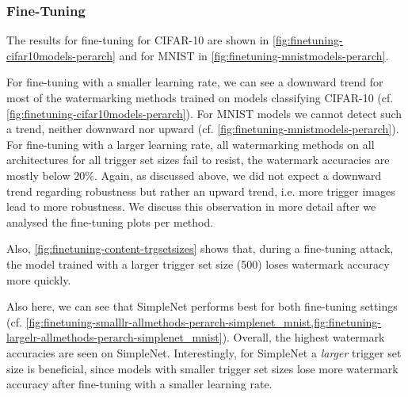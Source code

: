 \subsubsection{Fine-Tuning} \label{sec:eval-robustness-finetuning}




The results for fine-tuning for CIFAR-10 are shown in \cref{fig:finetuning-cifar10models-perarch} and for MNIST in \cref{fig:finetuning-mnistmodels-perarch}.

For fine-tuning with a smaller learning rate, we can see a downward trend for most of the watermarking methods trained on models classifying CIFAR-10 (cf. \cref{fig:finetuning-cifar10models-perarch}). For MNIST models we cannot detect such a trend, neither downward nor upward (cf. \cref{fig:finetuning-mnistmodels-perarch}). For fine-tuning with a larger learning rate, all watermarking methods on all architectures for all trigger set sizes fail to resist, the watermark accuracies are mostly below $20\%$. Again, as discussed above, we did not expect a downward trend regarding robustness but rather an upward trend, i.e. more trigger images lead to more robustness. We discuss this observation in more detail after we analysed the fine-tuning plots per method.



Also, \cref{fig:finetuning-content-trgsetsizes} shows that, during a fine-tuning attack, the model trained with a larger trigger set size (500) loses watermark accuracy more quickly.

Also here, we can see that SimpleNet performs best for both fine-tuning settings (cf. \cref{fig:finetuning-smalllr-allmethods-perarch-simplenet_mnist,fig:finetuning-largelr-allmethods-perarch-simplenet_mnist}). Overall, the highest watermark accuracies are seen on SimpleNet. Interestingly, for SimpleNet a \textit{larger} trigger set size is beneficial, since models with smaller trigger set sizes lose more watermark accuracy after fine-tuning with a smaller learning rate.




